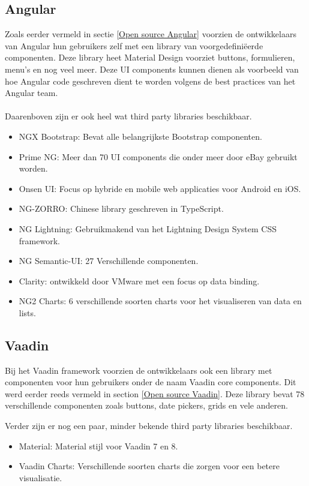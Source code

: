 \subsection{Angular}
Zoals eerder vermeld in sectie \ref{Open source Angular} voorzien de ontwikkelaars van Angular hun gebruikers zelf met een library van voorgedefiniëerde componenten. Deze library heet Material Design voorziet buttons, formulieren, menu's en nog veel meer. Deze UI components kunnen dienen als voorbeeld van hoe Angular code geschreven dient te worden volgens de best practices van het Angular team.
\\ \\
Daarenboven zijn er ook heel wat third party libraries beschikbaar. 
\begin{itemize}
	\item NGX Bootstrap: Bevat alle belangrijkste Bootstrap componenten.
	\item Prime NG: Meer dan 70 UI components die onder meer door eBay gebruikt worden. 
	\item Onsen UI: Focus op hybride en mobile web applicaties voor Android en iOS.
	\item NG-ZORRO: Chinese library geschreven in TypeScript.
	\item NG Lightning: Gebruikmakend van het Lightning Design System CSS framework.
	\item NG Semantic-UI: 27 Verschillende componenten.
	\item Clarity: ontwikkeld door VMware met een focus op data binding.
	\item NG2 Charts: 6 verschillende soorten charts voor het visualiseren van data en lists.
\end{itemize}

\subsection{Vaadin}
Bij het Vaadin framework voorzien de ontwikkelaars ook een library met componenten voor hun gebruikers onder de naam Vaadin core components. Dit werd eerder reeds vermeld in section \ref{Open source Vaadin}. Deze library bevat 78 verschillende componenten zoals buttons, date pickers, grids en vele anderen. 

Verder zijn er nog een paar, minder bekende third party libraries beschikbaar.
\begin{itemize}
	\item Material: Material stijl voor Vaadin 7 en 8.
	\item Vaadin Charts: Verschillende soorten charts die zorgen voor een betere visualisatie. 
\end{itemize}

